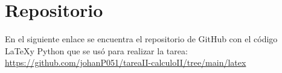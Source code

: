 \section{Repositorio}

En el siguiente enlace se encuentra el repositorio de GitHub con el código \LaTeX y Python que se usó para realizar la tarea: \url{https://github.com/johanP051/tareaII-calculoII/tree/main/latex}